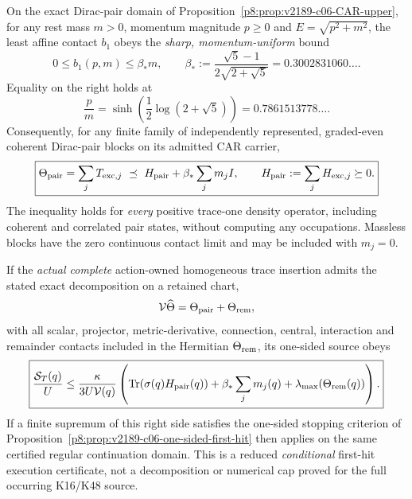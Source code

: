 \documentclass[12pt,a4paper]{article}
\begin{document}
\begin{corollary}
\label{p8:cor:v2256-k48-pair-contact-ceiling}
On the exact Dirac-pair domain of
Proposition~\ref{p8:prop:v2189-c06-CAR-upper}, for any rest mass
$m>0$, momentum magnitude $p\ge0$ and $E=\sqrt{p^2+m^2}$, the
least affine contact $b_1$ obeys the \emph{sharp, momentum-uniform} bound
\[
 \boxed{0\le b_1(p,m)\le\beta_*m,\qquad
 \beta_*:=\frac{\sqrt5-1}{2\sqrt{2+\sqrt5}}
 =0.3002831060\ldots.}
\]
Equality on the right holds at
\[
 \frac p m=\sinh\!\left(\frac12\log(2+\sqrt5)\right)
 =0.7861513778\ldots.
\]
Consequently, for any finite family of independently represented,
graded-even coherent Dirac-pair blocks on its admitted CAR carrier,
\[
 \boxed{\Theta_{\rm pair}=\sum_j T_{{\rm exc},j}
 \ \preceq\ H_{\rm pair}+\beta_*\sum_jm_j I,\qquad
 H_{\rm pair}:=\sum_j H_{{\rm exc},j}\succeq0.}
\]
The inequality holds for \emph{every} positive trace-one density
operator, including coherent and correlated pair states, without
computing any occupations. Massless blocks have the zero continuous
contact limit and may be included with $m_j=0$.

If the \emph{actual complete} action-owned homogeneous trace
insertion admits the stated exact decomposition on a retained chart,
\[
 \mathcal V\widehat\Theta
 =\Theta_{\rm pair}+\Theta_{\rm rem},
\]
with all scalar, projector, metric-derivative, connection, central,
interaction and remainder contacts included in the Hermitian
$\Theta_{\rm rem}$, its one-sided source obeys
\[
 \boxed{\frac{\mathcal S_T(q)}{U}
 \le\frac{\kappa}{3U\mathcal V(q)}
 \left(\operatorname{Tr}(\sigma(q)H_{\rm pair}(q))
 +\beta_*\sum_jm_j(q)
 +\lambda_{\max}(\Theta_{\rm rem}(q))\right).}
\]
If a finite supremum of this right side satisfies the one-sided stopping
criterion of Proposition~\ref{p8:prop:v2189-c06-one-sided-first-hit}
then applies on the same certified regular continuation domain.
This is a reduced \emph{conditional} first-hit execution certificate,
not a decomposition or numerical cap proved for the full occurring
K16/K48 source.
\end{corollary}
\end{document}

